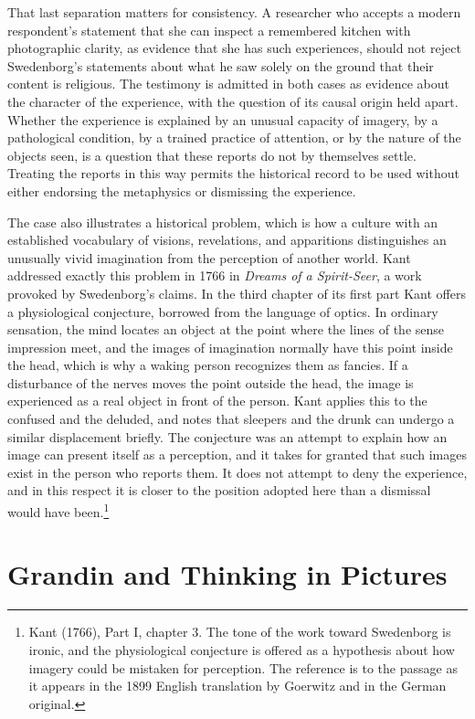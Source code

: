 \documentclass[11pt]{article}
\theoremstyle{remark}
\begin{document}
That last separation matters for consistency. A researcher who accepts a modern respondent's statement that she can inspect a remembered kitchen with photographic clarity, as evidence that she has such experiences, should not reject Swedenborg's statements about what he saw solely on the ground that their content is religious. The testimony is admitted in both cases as evidence about the character of the experience, with the question of its causal origin held apart. Whether the experience is explained by an unusual capacity of imagery, by a pathological condition, by a trained practice of attention, or by the nature of the objects seen, is a question that these reports do not by themselves settle. Treating the reports in this way permits the historical record to be used without either endorsing the metaphysics or dismissing the experience.

The case also illustrates a historical problem, which is how a culture with an established vocabulary of visions, revelations, and apparitions distinguishes an unusually vivid imagination from the perception of another world. Kant addressed exactly this problem in 1766 in \emph{Dreams of a Spirit-Seer}, a work provoked by Swedenborg's claims. In the third chapter of its first part Kant offers a physiological conjecture, borrowed from the language of optics. In ordinary sensation, the mind locates an object at the point where the lines of the sense impression meet, and the images of imagination normally have this point inside the head, which is why a waking person recognizes them as fancies. If a disturbance of the nerves moves the point outside the head, the image is experienced as a real object in front of the person. Kant applies this to the confused and the deluded, and notes that sleepers and the drunk can undergo a similar displacement briefly. The conjecture was an attempt to explain how an image can present itself as a perception, and it takes for granted that such images exist in the person who reports them. It does not attempt to deny the experience, and in this respect it is closer to the position adopted here than a dismissal would have been.\footnote{Kant (1766), Part I, chapter 3. The tone of the work toward Swedenborg is ironic, and the physiological conjecture is offered as a hypothesis about how imagery could be mistaken for perception. The reference is to the passage as it appears in the 1899 English translation by Goerwitz and in the German original.}

\section{Grandin and Thinking in Pictures}
\end{document}
